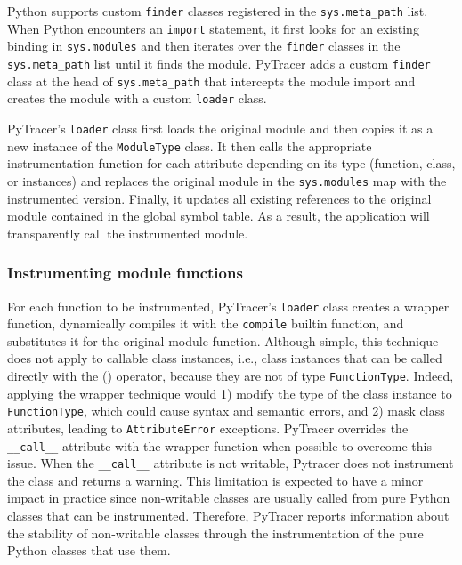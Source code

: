 \documentclass[10pt,journal,compsoc]{IEEEtran}
\newcommand{\pytracer}[0]{PyTracer\xspace}
\DeclareRobustCommand{\add}[1]{\textcolor{ao(english)}{#1}}%
\DeclareRobustCommand{\remove}[1]{}
\DeclareRobustCommand{\add}[1]{#1}
\DeclareRobustCommand{\remove}[1]{}
\begin{document}
Python supports custom \texttt{finder} classes registered in the
\texttt{sys.meta\_path} list. When Python encounters an \texttt{import}
statement, it first looks for an existing binding in \texttt{sys.modules} and
then iterates over the \texttt{finder} classes in the \texttt{sys.meta\_path}
list until it finds the module. \pytracer adds a custom \texttt{finder} class at
the head of \texttt{sys.meta\_path} that intercepts the module import and
creates the module with a custom \texttt{loader} class.

\pytracer's \texttt{loader} class first loads the original module and then copies
it as a new instance of the \texttt{ModuleType} class. It then calls the
appropriate instrumentation function for each attribute depending on its type
(function, class, or instances) and replaces the original module in the
\texttt{sys.modules} map with the instrumented version. Finally, it updates all
existing references to the original module contained in the global symbol table.
As a result, the application will transparently call the instrumented module.

\subsubsection{Instrumenting module functions}

\remove{Listings~\mbox{\ref{fig:wrapper_creation}} and~\mbox{\ref{fig:generic_wrapper}} show
    \mbox{\pytracer}'s function instrumentation mechanism.}
For each function to be instrumented, \pytracer's \texttt{loader} class creates a
wrapper function, dynamically compiles it with the \texttt{compile} builtin
function, and substitutes it for the original module function.  Although simple,
this technique does not apply to callable class instances, i.e., class instances
\add{that can be called directly with the () operator, because they} are not of type
\texttt{FunctionType}. Indeed, applying the wrapper technique would 1) modify
the type of the class instance to \texttt{FunctionType}, which could cause
syntax and semantic errors, and 2) mask class attributes, leading to
\texttt{AttributeError} exceptions. \pytracer overrides the
\texttt{\_\_call\_\_} attribute with the wrapper function when possible to
overcome this issue. When the \texttt{\_\_call\_\_} attribute is not writable,
Pytracer does not instrument the class and returns a warning. 
\add{
    This limitation is expected to have a minor impact in practice since non-writable
    classes are usually called from pure Python classes that can be
    instrumented. Therefore, \pytracer reports information about the stability of
    non-writable classes through the instrumentation of the pure Python
    classes that use them.
}
\end{document}
